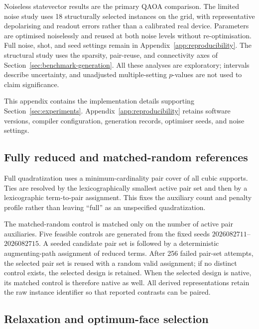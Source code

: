 \documentclass[a4paper,onecolumn,11pt,unpublished]{quantumarticle}
\theoremstyle{remark}
\begin{document}
Noiseless statevector results are the primary QAOA comparison. The limited
noise study uses 18 structurally selected instances on the grid, with
representative depolarising and readout errors rather than a calibrated real
device. Parameters are optimised noiselessly and reused at both noise levels
without re-optimisation. Full noise, shot, and seed settings remain in
Appendix~\ref{app:reproducibility}. The structural study uses the sparsity,
pair-reuse, and connectivity axes of Section~\ref{sec:benchmark-generation}.
All these analyses are exploratory; intervals describe uncertainty, and
unadjusted multiple-setting $p$-values are not used to claim significance.



This appendix contains the implementation details supporting
Section~\ref{sec:experiments}. Appendix~\ref{app:reproducibility} retains
software versions, compiler configuration, generation records, optimiser
seeds, and noise settings.

\subsection{Fully reduced and matched-random references}
\label{app:experimental-controls}

Full quadratization uses a minimum-cardinality pair cover of all
cubic supports.  Ties are resolved by the lexicographically smallest active
pair set and then by a lexicographic term-to-pair assignment.  This fixes the
auxiliary count and penalty profile rather than leaving ``full'' as an
unspecified quadratization.

The matched-random control is matched only on the number of active pair
auxiliaries.  Five feasible controls are generated from the fixed seeds
$2026082711$--$2026082715$.  A seeded candidate pair set is followed by a
deterministic augmenting-path assignment of reduced terms.  After 256 failed
pair-set attempts, the selected pair set is reused with a random valid
assignment; if no distinct control exists, the selected design is retained.
When the selected design is native, its matched control is therefore native as
well.  All derived representations retain the raw instance identifier so that
reported contrasts can be paired.


\subsection{Relaxation and optimum-face selection}
\label{app:experimental-lp}
\end{document}
